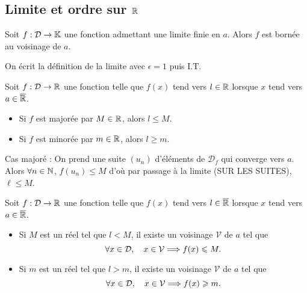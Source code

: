 \documentclass{magnolia}
\begin{document}
\subsection{Limite et ordre sur $\mathbb{R}$}

\begin{proposition}[utile=-3]
Soit $f:\mathcal{D}\to\mathbb{K}$ une fonction admettant une limite finie en $a$.
Alors $f$ est bornée au voisinage de $a$.  
\end{proposition}

\begin{preuve}
On écrit la définition de la limite avec $\epsilon=1$ puis I.T.
\end{preuve}

\begin{proposition}[utile=-3]
Soit $f:\mathcal{D}\to\mathbb{R}$ une fonction telle que $f(x)$ tend vers $l\in\mathbb{R}$ lorsque
$x$ tend vers $a\in\overline{\mathbb{R}}$.
\begin{itemize}
\item Si $f$ est majorée par $M\in\mathbb{R}$, alors $l\leq M$.
\item Si $f$ est minorée par $m\in\mathbb{R}$, alors $l\geq m$.
\end{itemize}
\end{proposition}

\begin{preuve}
Cas majoré : On prend une suite $(u_n)$ d'éléments de $\mathcal{D}_f$ qui converge vers $a$. Alors $\forall n \in \mathbb{N}$, $f(u_n)\leq M$ d'où par passage à la limite (SUR LES SUITES), $\ell\leq M$.

\end{preuve}


\begin{proposition}[utile=-3]
Soit $f:\mathcal{D}\to\mathbb{R}$ une fonction telle que $f(x)$ tend vers $l\in\overline{\mathbb{R}}$ lorsque
$x$ tend vers $a\in\overline{\mathbb{R}}$.
\begin{itemize}
\item Si $M$ est un réel tel que $l<M$, il existe un voisinage $\mathcal{V}$
  de $a$ tel que
  \[\forall x\in\mathcal{D} ,\quad x\in\mathcal{V} \Longrightarrow f(x)\leqslant M.\]
\item Si $m$ est un réel tel que $l>m$, il existe un voisinage $\mathcal{V}$
  de $a$ tel que
  \[\forall x\in\mathcal{D} ,\quad x\in\mathcal{V} \Longrightarrow f(x)\geqslant m.\]
\end{itemize}
\end{proposition}
\end{document}
